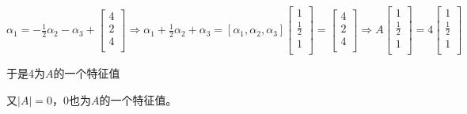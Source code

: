 \documentclass[lang=cn,10pt]{elegantbook}
\begin{document}
$\alpha _1=-\frac{1}{2}\alpha _2-\alpha _3+\left[ \begin{array}{c}
	4\\
	2\\
	4\\
\end{array} \right] \Rightarrow \alpha _1+\frac{1}{2}\alpha _2+\alpha _3=[\alpha _1,\alpha _2,\alpha _3]\left[ \begin{array}{c}
	1\\
	\frac{1}{2}\\
	1\\
\end{array} \right] =\left[ \begin{array}{c}
	4\\
	2\\
	4\\
\end{array} \right] \Rightarrow A\left[ \begin{array}{c}
	1\\
	\frac{1}{2}\\
	1\\
\end{array} \right] =4\left[ \begin{array}{c}
	1\\
	\frac{1}{2}\\
	1\\
\end{array} \right] $
	
	于是4为$A$的一个特征值
	
	又$|A|=0$，0也为$A$的一个特征值。
	
\end{document}
